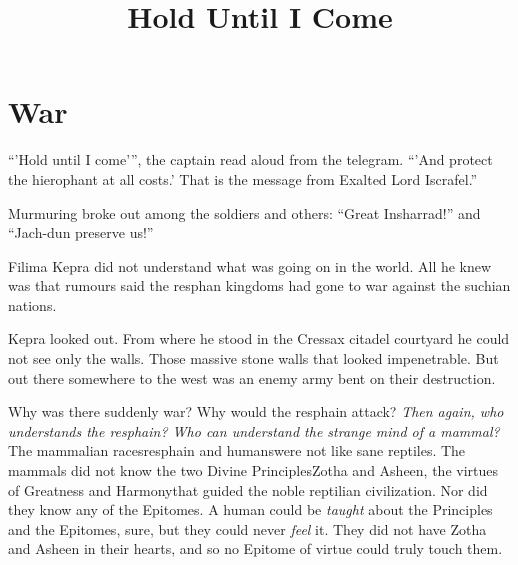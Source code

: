 \documentclass
  [a4paper,
   12pt,
   oneside
  ]%
  {article}
\title{Hold Until I Come}
\begin{document}
    \maketitle
    \tableofcontents














% 



\section{War}
``'Hold until I come'{}'', the captain read aloud from the telegram. ``'And protect the hierophant at all costs.' That is the message from Exalted Lord Iscrafel.'' 

Murmuring broke out among the soldiers and others: ``Great Insharrad!'' and ``Jach-dun preserve us!'' 

Filima Kepra did not understand what was going on in the world. 
All he knew was that rumours said the resphan kingdoms had gone to war against the suchian nations. 

Kepra looked out. From where he stood in the Cressax citadel courtyard he could not see only the walls. Those massive stone walls that looked impenetrable. 
But out there somewhere to the west was an enemy army bent on their destruction.

Why was there suddenly war? Why would the resphain attack? 
\emph{Then again, who understands the resphain? Who can understand the strange mind of a mammal?} 
The mammalian races\dash{}resphain and humans\dash{}were not like sane reptiles. The mammals did not know the two Divine Principles\dash{}Zotha and Asheen, the virtues of Greatness and Harmony\dash{}that guided the noble reptilian civilization. Nor did they know any of the Epitomes. A human could be \emph{taught} about the Principles and the Epitomes, sure, but they could never \emph{feel} it. They did not have Zotha and Asheen in their hearts, and so no Epitome of virtue could truly touch them. 
\end{document}
